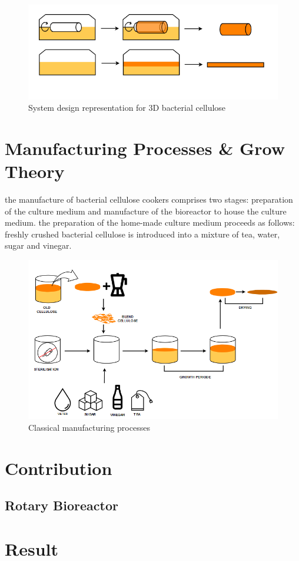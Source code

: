 \begin{figure}[h]
    \centering
    \includegraphics{images/shema3Dscoby.png}
    \caption{System design representation for 3D bacterial cellulose}
    \label{fig:diagBC3D}
\end{figure} 

\section{Manufacturing Processes \& Grow Theory}

the manufacture of bacterial cellulose cookers comprises two stages: preparation of the culture medium and manufacture of the bioreactor to house the culture medium. 
the preparation of the home-made culture medium proceeds as follows:
freshly crushed bacterial cellulose is introduced into a mixture of tea, water, sugar and vinegar. 


\begin{figure}[h]
    \centering
    \includegraphics{images/SCOBY_diag.png}
    \caption{Classical manufacturing processes}
    \label{fig:}
\end{figure} 

\section{Contribution}

\subsection{Rotary Bioreactor}


\section{Result}

